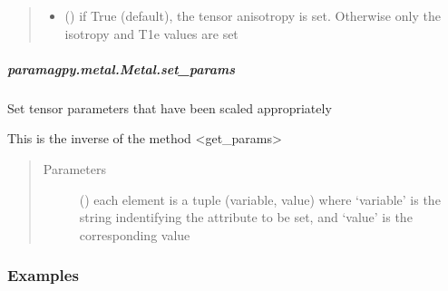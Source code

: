 \documentclass[a4paper,10pt,english,openany,oneside]{sphinxmanual}
\begin{document}
\begin{fulllineitems}
\begin{fulllineitems}
\begin{fulllineitems}
\begin{quote}
\begin{description}
\begin{itemize}
\item {} 
 (\sphinxstyleliteralemphasis{\sphinxupquote{ (}}\sphinxstyleliteralemphasis{\sphinxupquote{)}}) \textendash{} if True (default), the tensor anisotropy is set.
Otherwise only the isotropy and T1e values are set

\end{itemize}

\end{description}\end{quote}

\end{fulllineitems}



\subparagraph{paramagpy.metal.Metal.set\_params}
\label{\detokenize{reference/generated/paramagpy.metal.Metal.set_params:paramagpy-metal-metal-set-params}}\label{\detokenize{reference/generated/paramagpy.metal.Metal.set_params::doc}}

\begin{fulllineitems}
\label{\detokenize{reference/generated/paramagpy.metal.Metal.set_params:paramagpy.metal.Metal.set_params}}
Set tensor parameters that have been scaled appropriately

This is the inverse of the method \textless{}get\_params\textgreater{}
\begin{quote}\begin{description}
\item[{Parameters}] \leavevmode
{} () \textendash{} each element is a tuple (variable, value) where ‘variable’
is the string indentifying the attribute to be set, and ‘value’
is the corresponding value

\end{description}\end{quote}
\subsubsection*{Examples}


\end{fulllineitems}
\end{fulllineitems}
\end{fulllineitems}
\end{document}
